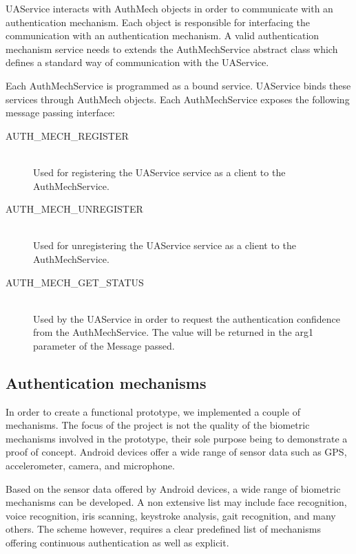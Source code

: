 UAService interacts with AuthMech objects in order to communicate with an authentication mechanism. Each object is responsible for interfacing the communication with an authentication mechanism. A valid authentication mechanism service needs to extends the AuthMechService abstract class which defines a standard way of communication with the UAService.

Each AuthMechService is programmed as a bound service. UAService binds these services through AuthMech objects. Each AuthMechService exposes the following message passing interface:
\begin{description}
  \item[AUTH\_MECH\_REGISTER] \hfill \\
  Used for registering the UAService service as a client to the AuthMechService.
  
  \item[AUTH\_MECH\_UNREGISTER] \hfill \\
  Used for unregistering the UAService service as a client to the AuthMechService.
  
  \item[AUTH\_MECH\_GET\_STATUS] \hfill \\
  Used by the UAService in order to request the authentication confidence from the AuthMechService. The value will be returned in the arg1 parameter of the Message passed.
\end{description}

\subsection{Authentication mechanisms}
In order to create a functional prototype, we implemented a couple of mechanisms. The focus of the project is not the quality of the biometric mechanisms involved in the prototype, their sole purpose being to demonstrate a proof of concept. Android devices offer a wide range of sensor data such as GPS, accelerometer, camera, and microphone.

Based on the sensor data offered by Android devices, a wide range of biometric mechanisms can be developed. A non extensive list may include face recognition, voice recognition, iris scanning, keystroke analysis, gait recognition, and many others. The scheme however, requires a clear predefined list of mechanisms offering continuous authentication as well as explicit.

